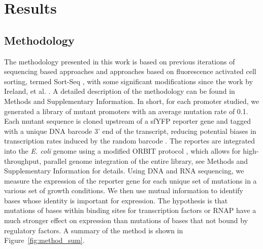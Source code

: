 \section{Results}
\subsection{Methodology}
The methodology presented in this work is based on previous iterations of sequencing based approaches \cite{ireland2020deciphering} and approaches based on fluorescence activated cell sorting, termed Sort-Seq \cite{kinney2010using, belliveau2018systematic}, with some significant modifications since the work by Ireland, et al. \cite{ireland2020deciphering}. A detailed description of the methodology can be found in Methods and Supplementary Information. In short, for each promoter studied, we generated a library of mutant promoters with an average mutation rate of 0.1. Each mutant sequence is cloned upstream of a sfYFP reporter gene and tagged with a unique DNA barcode 3' end of the transcript, reducing potential biases in transcription rates induced by the random barcode . The reportes are integrated into the \textit{E. coli} genome using a modified ORBIT protocol \cite{saunders2023orbit}, which allows for high-throughput, parallel genome integration of the entire library, see Methods and Supplementary Information for details. Using DNA and RNA sequencing, we measure the expression of the reporter gene for each unique set of mutations in a various set of growth conditions. We then use mutual information to identify bases whose identity is important for expression. The hypothesis is that mutations of bases within binding sites for transcription factors or RNAP have a much stronger effect on expression than mutations of bases that not bound by regulatory factors.  A summary of the method is shown in Figure~\ref{fig:method_sum}.
